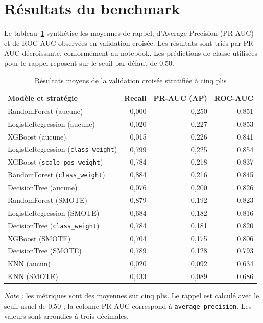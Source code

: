 \section{Résultats du benchmark}
Le tableau~\ref{tab:benchmark-modeles} synthétise les moyennes de rappel, d'Average Precision (PR-AUC) et de ROC-AUC observées en validation croisée. Les résultats sont triés par PR-AUC décroissante, conformément au notebook. Les prédictions de classe utilisées pour le rappel reposent sur le seuil par défaut de 0,50.

\begin{table}[H]
    \centering
    \caption{Résultats moyens de la validation croisée stratifiée à cinq plis}
    \label{tab:benchmark-modeles}
    \small
    \renewcommand{\arraystretch}{1.12}
    \begin{tabular}{@{}lrrr@{}}
        \toprule
        \textbf{Modèle et stratégie} & \textbf{Recall} & \textbf{PR-AUC (AP)} & \textbf{ROC-AUC}\\
        \midrule
        RandomForest (aucune) & 0,000 & 0,250 & 0,851\\
        LogisticRegression (aucune) & 0,020 & 0,227 & 0,853\\
        XGBoost (aucune) & 0,015 & 0,226 & 0,841\\
        LogisticRegression (\texttt{class\_weight}) & 0,799 & 0,225 & 0,854\\
        XGBoost (\texttt{scale\_pos\_weight}) & 0,784 & 0,218 & 0,837\\
        RandomForest (\texttt{class\_weight}) & 0,884 & 0,216 & 0,845\\
        DecisionTree (aucune) & 0,076 & 0,200 & 0,826\\
        RandomForest (SMOTE) & 0,879 & 0,192 & 0,823\\
        LogisticRegression (SMOTE) & 0,684 & 0,182 & 0,816\\
        DecisionTree (\texttt{class\_weight}) & 0,784 & 0,181 & 0,820\\
        XGBoost (SMOTE) & 0,704 & 0,175 & 0,806\\
        DecisionTree (SMOTE) & 0,789 & 0,128 & 0,793\\
        KNN (aucun) & 0,020 & 0,092 & 0,634\\
        KNN (SMOTE) & 0,433 & 0,089 & 0,686\\
        \bottomrule
    \end{tabular}

    \vspace{0.15cm}
    \begin{minipage}{0.94\textwidth}
        \footnotesize
        \textit{Note :} les métriques sont des moyennes sur cinq plis. Le rappel est calculé avec le seuil usuel de 0,50 ; la colonne PR-AUC correspond à \texttt{average\_precision}. Les valeurs sont arrondies à trois décimales.
    \end{minipage}
\end{table}

